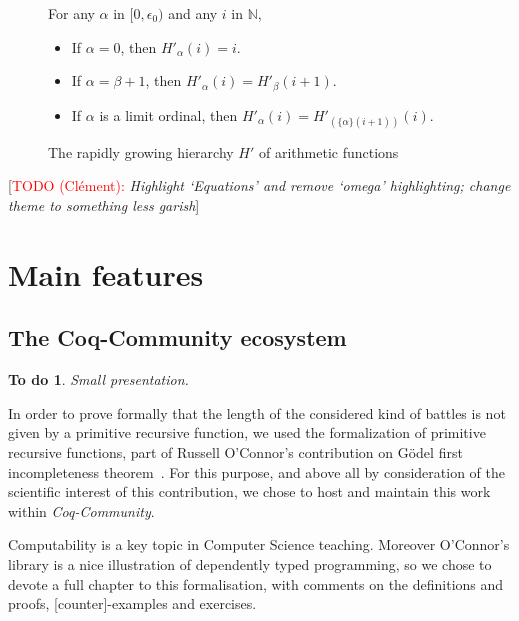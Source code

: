 \documentclass{easychair}
\makeatletter
\newcommand{\inputsnippets}[1]
  {{\setlength{\itemsep}{1pt}\setlength{\parsep}{0pt}%
    \alectryon@copymacros\begin{io}
      \forcsvlist{\item\@inputsnippet}{#1}
    \end{io}}}
\let@old Save definition of 
\newcommand{\@inputsnippet}[1]
  {{\renewenvironment{alectryon}{}{}%
    @old{#1}}}
\newcommand{\canonseq}[2]{\mbox{$\{#1\}(#2)$}}
\newtheorem{todo}{To do}
\newcommand{\TODO}[2][]{[\textcolor{red}{TODO (#1):} \emph{#2}]}
\makeatother
\begin{document}
\begin{figure}[h]
 \noindent
 For any $\alpha$ in $[0,\epsilon_0)$ and any $i$ in $\mathbb{N}$,
   \begin{itemize}
\item If $\alpha=0$, then $H'_\alpha (i)= i$.
\item If $\alpha=\beta+1$, then 
$H'_\alpha(i)=H'_\beta(i+1)$.
\item If $\alpha$ is a limit ordinal, then 
$H'_\alpha(i) = H'_{(\canonseq{\alpha}{i+1})}(i)$.
\end{itemize}
\vspace{4pt}
\inputsnippets{HprimeDef}
\caption{The rapidly growing hierarchy $H'$ of arithmetic functions}
\label{fig:Hprime}
\end{figure}

\label{sect:not-pr}

\TODO[Clément]{Highlight `Equations' and remove `omega' highlighting; change theme to something less garish}

 
\section{Main features}




\subsection{The Coq-Community ecosystem}
\begin{todo}
Small presentation.
\end{todo}

In order to prove formally that the length of the considered
kind of battles is not given by a primitive recursive function, we used the formalization of primitive recursive functions, part
of Russell O'Connor's contribution on G\"{o}del first incompleteness theorem~\cite{OConnor05, Goedel}.
For this purpose, and above all by consideration of the scientific interest of this contribution, we chose to host and maintain this work within \textit{Coq-Community}.

Computability is a key topic in Computer Science teaching. Moreover O'Connor's library is a nice illustration of dependently typed programming, so we chose to devote a full chapter to this formalisation, with comments on the definitions and proofs, [counter]-examples and exercises.
\end{document}

